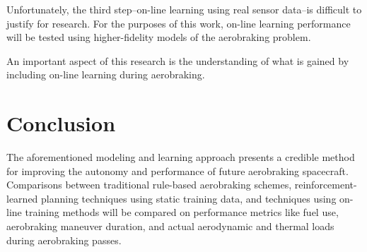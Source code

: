 \documentclass[paper,11pt]{AAS}		%
\begin{document}
Unfortunately, the third step--on-line learning using real sensor data--is difficult to justify for research. For the purposes 
of this work, on-line learning performance will be tested using higher-fidelity models of the aerobraking problem. 

An important aspect of this research is the understanding of what is gained by including on-line learning during aerobraking. 



\section{Conclusion}

The aforementioned modeling and learning approach presents a credible method for improving the autonomy and performance of 
future aerobraking spacecraft. Comparisons between traditional rule-based aerobraking schemes, reinforcement-learned planning 
techniques using static training data, and techniques using on-line training methods will be compared on performance metrics 
like fuel use, aerobraking maneuver duration, and actual aerodynamic and thermal loads during aerobraking passes.

\end{document}
